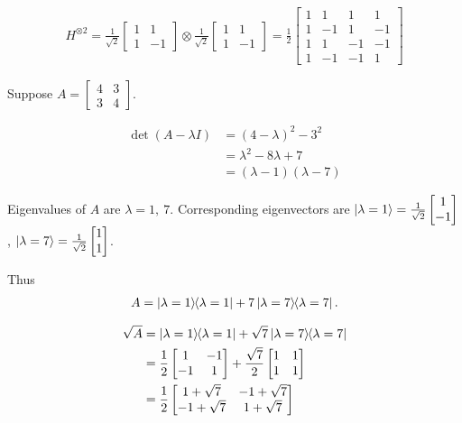\begin{align*}
	H^{\otimes 2}
	=
	\frac{1}{\sqrt{2}} \begin{bmatrix}
	1 & 1 \\
	1 & -1
	\end{bmatrix}
	\otimes
	\frac{1}{\sqrt{2}} \begin{bmatrix}
	1 & 1 \\
	1 & -1
	\end{bmatrix}
	=
	\frac{1}{2} \begin{bmatrix}
		1 & 1 & 1 & 1 \\
		1 & -1 & 1 & -1 \\
		1 & 1 & -1 & -1 \\
		1 & -1 & -1 & 1
	\end{bmatrix}
\end{align*}




Suppose $A = \begin{bmatrix}
4 & 3 \\
3 & 4
\end{bmatrix} $.

\begin{align*}
	\det (A - \lambda I ) &= (4-\lambda)^2 - 3^2\\
		&= \lambda^2 -8\lambda + 7\\
		&= (\lambda - 1)(\lambda - 7)
\end{align*}

Eigenvalues of $A$ are $\lambda = 1, ~ 7$.
Corresponding eigenvectors are
$
	\ket{\lambda = 1} = \frac{1}{\sqrt{2}} \begin{bmatrix}
	1 \\
	-1
	\end{bmatrix}
$,
$
	\ket{\lambda = 7} = \frac{1}{\sqrt{2}} \begin{bmatrix}
1 \\
1
\end{bmatrix}
$.

\vspace{5mm}
Thus
\begin{align*}
	A = \ket{\lambda = 1}\hspace{-1mm} \bra{\lambda = 1} + 7 \ket{\lambda = 7}\hspace{-1mm} \bra{\lambda = 7}.
\end{align*}

\begin{align*}
	\sqrt{A} &= \ket{\lambda = 1}\hspace{-1mm} \bra{\lambda = 1} + \sqrt{7} \ket{\lambda = 7}\hspace{-1mm} \bra{\lambda = 7}\\
		&= \frac{1}{2} \begin{bmatrix}
		1 & -1 \\
		-1 & 1
		\end{bmatrix}
		+
		\frac{\sqrt{7}}{2} \begin{bmatrix}
		1 & 1 \\
		1 & 1
		\end{bmatrix}\\
		&=
		\frac{1}{2}
		 \begin{bmatrix}
			1+\sqrt{7} & -1+\sqrt{7} \\
			-1 + \sqrt{7} & 1+\sqrt{7}
		\end{bmatrix}
\end{align*}

